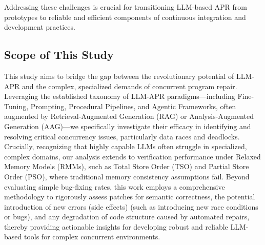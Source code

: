 Addressing these challenges is crucial for transitioning LLM-based APR from prototypes to reliable and efficient components of continuous integration and development practices.

\subsection{Scope of This Study}

This study aims to bridge the gap between the revolutionary potential of LLM-APR and the complex, specialized demands of concurrent program repair. Leveraging the established taxonomy of LLM-APR paradigms—including Fine-Tuning, Prompting, Procedural Pipelines, and Agentic Frameworks, often augmented by Retrieval-Augmented Generation (RAG) or Analysis-Augmented Generation (AAG)—we specifically investigate their efficacy in identifying and resolving critical concurrency issues, particularly data races and deadlocks. Crucially, recognizing that highly capable LLMs often struggle in specialized, complex domains, our analysis extends to verification performance under Relaxed Memory Models (RMMs), such as Total Store Order (TSO) and Partial Store Order (PSO), where traditional memory consistency assumptions fail. Beyond evaluating simple bug-fixing rates, this work employs a comprehensive methodology to rigorously assess patches for semantic correctness, the potential introduction of new errors (side effects) (such as introducing new race conditions or bugs), and any degradation of code structure caused by automated repairs, thereby providing actionable insights for developing robust and reliable LLM-based tools for complex concurrent environments.
